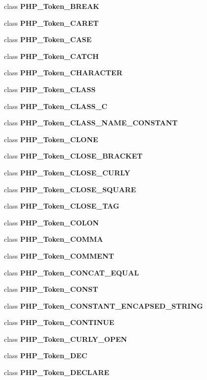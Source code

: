 \begin{DoxyCompactItemize}
\item 
class {\bf P\+H\+P\+\_\+\+Token\+\_\+\+B\+R\+E\+A\+K}
\item 
class {\bf P\+H\+P\+\_\+\+Token\+\_\+\+C\+A\+R\+E\+T}
\item 
class {\bf P\+H\+P\+\_\+\+Token\+\_\+\+C\+A\+S\+E}
\item 
class {\bf P\+H\+P\+\_\+\+Token\+\_\+\+C\+A\+T\+C\+H}
\item 
class {\bf P\+H\+P\+\_\+\+Token\+\_\+\+C\+H\+A\+R\+A\+C\+T\+E\+R}
\item 
class {\bf P\+H\+P\+\_\+\+Token\+\_\+\+C\+L\+A\+S\+S}
\item 
class {\bf P\+H\+P\+\_\+\+Token\+\_\+\+C\+L\+A\+S\+S\+\_\+\+C}
\item 
class {\bf P\+H\+P\+\_\+\+Token\+\_\+\+C\+L\+A\+S\+S\+\_\+\+N\+A\+M\+E\+\_\+\+C\+O\+N\+S\+T\+A\+N\+T}
\item 
class {\bf P\+H\+P\+\_\+\+Token\+\_\+\+C\+L\+O\+N\+E}
\item 
class {\bf P\+H\+P\+\_\+\+Token\+\_\+\+C\+L\+O\+S\+E\+\_\+\+B\+R\+A\+C\+K\+E\+T}
\item 
class {\bf P\+H\+P\+\_\+\+Token\+\_\+\+C\+L\+O\+S\+E\+\_\+\+C\+U\+R\+L\+Y}
\item 
class {\bf P\+H\+P\+\_\+\+Token\+\_\+\+C\+L\+O\+S\+E\+\_\+\+S\+Q\+U\+A\+R\+E}
\item 
class {\bf P\+H\+P\+\_\+\+Token\+\_\+\+C\+L\+O\+S\+E\+\_\+\+T\+A\+G}
\item 
class {\bf P\+H\+P\+\_\+\+Token\+\_\+\+C\+O\+L\+O\+N}
\item 
class {\bf P\+H\+P\+\_\+\+Token\+\_\+\+C\+O\+M\+M\+A}
\item 
class {\bf P\+H\+P\+\_\+\+Token\+\_\+\+C\+O\+M\+M\+E\+N\+T}
\item 
class {\bf P\+H\+P\+\_\+\+Token\+\_\+\+C\+O\+N\+C\+A\+T\+\_\+\+E\+Q\+U\+A\+L}
\item 
class {\bf P\+H\+P\+\_\+\+Token\+\_\+\+C\+O\+N\+S\+T}
\item 
class {\bf P\+H\+P\+\_\+\+Token\+\_\+\+C\+O\+N\+S\+T\+A\+N\+T\+\_\+\+E\+N\+C\+A\+P\+S\+E\+D\+\_\+\+S\+T\+R\+I\+N\+G}
\item 
class {\bf P\+H\+P\+\_\+\+Token\+\_\+\+C\+O\+N\+T\+I\+N\+U\+E}
\item 
class {\bf P\+H\+P\+\_\+\+Token\+\_\+\+C\+U\+R\+L\+Y\+\_\+\+O\+P\+E\+N}
\item 
class {\bf P\+H\+P\+\_\+\+Token\+\_\+\+D\+E\+C}
\item 
class {\bf P\+H\+P\+\_\+\+Token\+\_\+\+D\+E\+C\+L\+A\+R\+E}
\item 

\end{DoxyCompactItemize}
